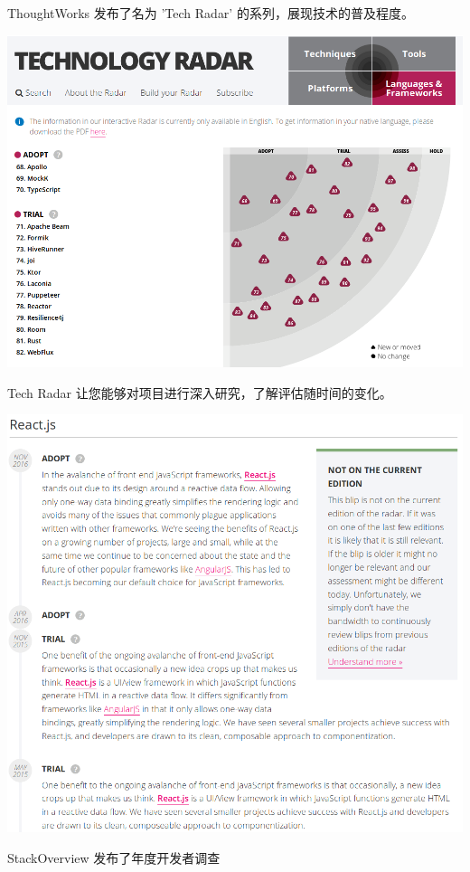ThoughtWorks 发布了名为 'Tech Radar' 的系列，展现技术的普及程度。

\includegraphics{images/organizational-project-skill-demand_tech-radar.png}

Tech Radar 让您能够对项目进行深入研究，了解评估随时间的变化。

\includegraphics{images/organizational-project-skill-demand_tech-react.png}

StackOverview 发布了年度开发者调查


